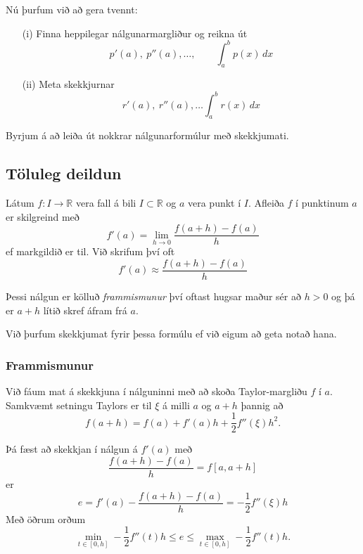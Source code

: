 \documentclass[icelandic,a4paper,12pt]{article}
\begin{document}
\pause
\smallskip
Nú þurfum við að gera tvennt:
\begin{enumerate}
\item[(i)] Finna heppilegar nálgunarmargliður og reikna út
$$
  p'(a), \ p''(a),\dots, \qquad \int_a^b p(x)\, dx 
$$
\item[(ii)]  Meta skekkjurnar
$$
  r'(a), \ r''(a), \dots \int_a^b r(x)\, dx
$$
\end{enumerate}
Byrjum á að leiða út nokkrar  nálgunarformúlur með skekkjumati. 


\subsection{Töluleg deildun} 
Látum $f : I \to \mathbb R$ vera fall á bili $I \subset \mathbb R$ og
$a$ vera punkt í $I$. Afleiða $f$ í punktinum $a$ er skilgreind með 
\begin{equation*}
  f'(a) = \lim\limits_{h \to 0}
  \frac{f(a+h)-f(a)}{h}
\end{equation*}
ef markgildið er til.  Við skrifum því oft
\begin{equation*}
  f'(a) \approx \frac{f(a+h)-f(a)}{h}
\end{equation*}

\pause
Þessi nálgun er kölluð {\em frammismunur} því oftast hugsar maður sér
að $h > 0$ og þá er $a+h$ lítið skref áfram frá $a$. 

\pause
\smallskip
Við þurfum skekkjumat fyrir þessa formúlu ef við eigum að geta notað hana.



\subsubsection{Frammismunur}
Við fáum mat á skekkjuna í nálguninni með að skoða Taylor-margliðu 
$f$ í $a$.  Samkvæmt setningu Taylors er til $\xi$ á milli $a$ og
$a+h$ þannig að  
\begin{equation*}
  f(a+h) = f(a) + f'(a)h + \frac{1}{2} f''(\xi)h^2.
\end{equation*}

\pause
Þá fæst að skekkjan í nálgun á $f'(a)$ með  
$$
  \frac{f(a+h)-f(a)}{h} = f[a,a+h]
$$ 
er 
\begin{equation*}
  e = f'(a) - \frac{f(a+h)-f(a)}{h} = -\frac{1}{2} f''(\xi) h
\end{equation*}
Með öðrum orðum
$$
\min_{t\in [0,h]} -\frac 12 f''(t)h \leq e \leq 
\max_{t\in [0,h]} -\frac 12 f''(t)h.
$$
\end{document}

